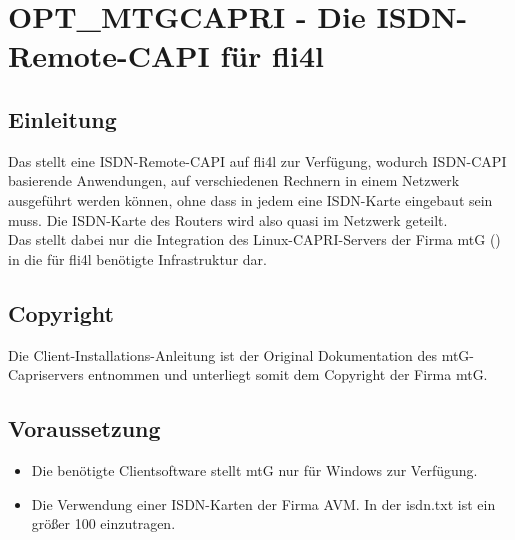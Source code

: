 {
\section {OPT\_MTGCAPRI - Die ISDN-Remote-CAPI für fli4l}
}

\subsection{Einleitung}

Das  stellt eine ISDN-Remote-CAPI auf fli4l zur Verfügung,
wodurch ISDN-CAPI basierende Anwendungen, auf verschiedenen Rechnern in einem
Netzwerk ausgeführt werden können, ohne dass in jedem eine ISDN-Karte eingebaut
sein muss. Die ISDN-Karte des Routers wird also quasi im Netzwerk geteilt. \\
Das  stellt dabei nur die Integration des
Linux-CAPRI-Servers der Firma mtG () in die für
fli4l benötigte Infrastruktur dar.

\subsection{Copyright}
Die Client-Installations-Anleitung ist der Original Dokumentation des
mtG-Capriservers entnommen und unterliegt somit dem Copyright der Firma mtG.

\subsection{Voraussetzung}
    \begin{itemize}
        \item Die benötigte Clientsoftware stellt mtG nur für Windows zur Verfügung. \\
        \item Die Verwendung einer ISDN-Karten der Firma AVM. In der isdn.txt ist
              ein  größer 100 einzutragen.
   \end{itemize}


